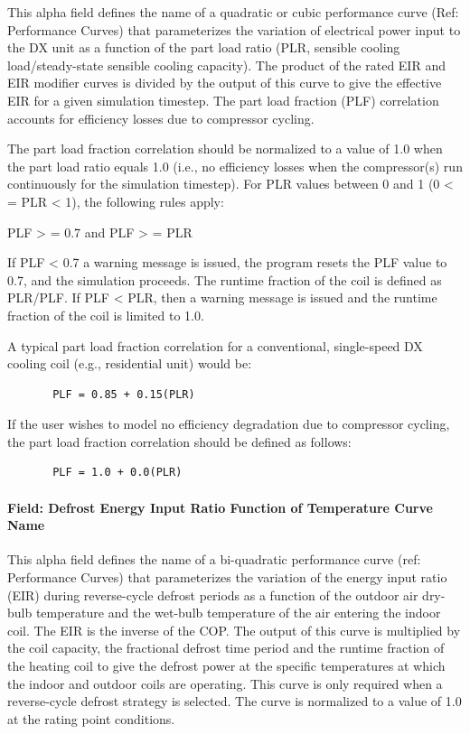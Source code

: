 This alpha field defines the name of a quadratic or cubic performance curve (Ref: Performance Curves) that parameterizes the variation of electrical power input to the DX unit as a function of the part load ratio (PLR, sensible cooling load/steady-state sensible cooling capacity). The product of the rated EIR and EIR modifier curves is divided by the output of this curve to give the effective EIR for a given simulation timestep. The part load fraction (PLF) correlation accounts for efficiency losses due to compressor cycling.

The part load fraction correlation should be normalized to a value of 1.0 when the part load ratio equals 1.0 (i.e., no efficiency losses when the compressor(s) run continuously for the simulation timestep). For PLR values between 0 and 1 (0 \textless{} = PLR \textless{} 1), the following rules apply:

PLF \textgreater{} = 0.7 and PLF \textgreater{} = PLR

If PLF \textless{} 0.7 a warning message is issued, the program resets the PLF value to 0.7, and the simulation proceeds. The runtime fraction of the coil is defined as PLR/PLF. If PLF \textless{} PLR, then a warning message is issued and the runtime fraction of the coil is limited to 1.0.

A typical part load fraction correlation for a conventional, single-speed DX cooling coil (e.g., residential unit) would be:

\begin{lstlisting}
       PLF = 0.85 + 0.15(PLR)
\end{lstlisting}

If the user wishes to model no efficiency degradation due to compressor cycling, the part load fraction correlation should be defined as follows:

\begin{lstlisting}
       PLF = 1.0 + 0.0(PLR)
\end{lstlisting}

\paragraph{Field: Defrost Energy Input Ratio Function of Temperature Curve Name}\label{field-defrost-energy-input-ratio-function-of-temperature-curve-name}

This alpha field defines the name of a bi-quadratic performance curve (ref: Performance Curves) that parameterizes the variation of the energy input ratio (EIR) during reverse-cycle defrost periods as a function of the outdoor air dry-bulb temperature and the wet-bulb temperature of the air entering the indoor coil. The EIR is the inverse of the COP. The output of this curve is multiplied by the coil capacity, the fractional defrost time period and the runtime fraction of the heating coil to give the defrost power at the specific temperatures at which the indoor and outdoor coils are operating. This curve is only required when a reverse-cycle defrost strategy is selected. The curve is normalized to a value of 1.0 at the rating point conditions.

